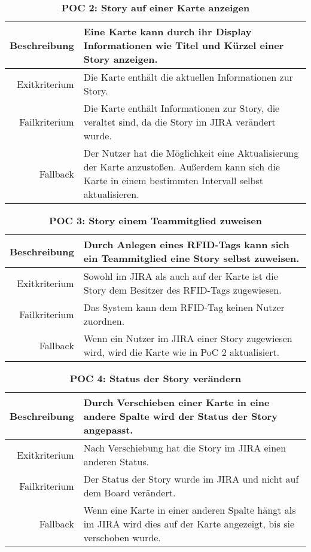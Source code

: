 \documentclass[12pt,titlepage]{scrartcl}
\begin{document}
\begin{table}[H]
\centering
\caption{\textbf{POC 2: Story auf einer Karte anzeigen}}
\label{poc2}
\begin{tabularx}{\linewidth}{|r|X|}
\hline
Beschreibung  & Eine Karte kann durch ihr Display Informationen wie Titel und Kürzel einer Story anzeigen. \\ \hline
Exitkriterium & Die Karte enthält die aktuellen Informationen zur Story. \\ \hline
Failkriterium & Die Karte enthält Informationen zur Story, die veraltet sind, da die Story im JIRA verändert wurde.
 \\ \hline
Fallback      & Der Nutzer hat die Möglichkeit eine Aktualisierung der Karte anzustoßen. Außerdem kann sich die Karte in einem bestimmten Intervall selbst aktualisieren.
 \\ \hline
\end{tabularx}
\end{table}

\begin{table}[H]
\centering
\caption{\textbf{POC 3: Story einem Teammitglied zuweisen}}
\label{poc3}
\begin{tabularx}{\linewidth}{|r|X|}
\hline
Beschreibung  & Durch Anlegen eines RFID-Tags kann sich ein Teammitglied eine Story selbst zuweisen.  \\ \hline
Exitkriterium & Sowohl im JIRA als auch auf der Karte ist die Story dem Besitzer des RFID-Tags zugewiesen. \\ \hline
Failkriterium & Das System kann dem RFID-Tag keinen Nutzer zuordnen.
 \\ \hline
Fallback      & Wenn ein Nutzer im JIRA einer Story zugewiesen wird, wird die Karte wie in PoC 2 aktualisiert. 
 \\ \hline
\end{tabularx}
\end{table}

\begin{table}[H]
\centering
\caption{\textbf{POC 4: Status der Story verändern}}
\label{poc4}
\begin{tabularx}{\linewidth}{|r|X|}
\hline
Beschreibung  & Durch Verschieben einer Karte in eine andere Spalte wird der Status der Story angepasst.  \\ \hline
Exitkriterium & Nach Verschiebung hat die Story im JIRA einen anderen Status. \\ \hline
Failkriterium & Der Status der Story wurde im JIRA und nicht auf dem Board verändert. \\ \hline
Fallback      & Wenn eine Karte in einer anderen Spalte hängt als im JIRA wird dies auf der Karte angezeigt, bis sie verschoben wurde.  \\ \hline
\end{tabularx}
\end{table}
	\newpage	
\end{document}
